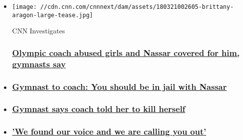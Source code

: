 \begin{itemize}
\item
  \href{https://www.cnn.com/interactive/2018/03/investigates/john-geddert-abuse/}{}

  \texttt{[image: //cdn.cnn.com/cnnnext/dam/assets/180321002605-brittany-aragon-large-tease.jpg]}

  CNN Investigates

  \hypertarget{olympic-coach-abused-girls-and-nassar-covered-for-him-gymnasts-say}{%
  \subsubsection{\texorpdfstring{\href{https://www.cnn.com/interactive/2018/03/investigates/john-geddert-abuse/}{Olympic
  coach abused girls and Nassar covered for him, gymnasts
  say}}{Olympic coach abused girls and Nassar covered for him, gymnasts say}}\label{olympic-coach-abused-girls-and-nassar-covered-for-him-gymnasts-say}}
\item
  \hypertarget{gymnast-to-coach-you-should-be-in-jail-with-nassar}{%
  \subsubsection{\texorpdfstring{\href{/videos/us/2018/03/23/former-gymnasts-call-out-coach-orig-tc.cnn}{Gymnast
  to coach: You should be in jail with
  Nassar}}{Gymnast to coach: You should be in jail with Nassar}}\label{gymnast-to-coach-you-should-be-in-jail-with-nassar}}
\item
  \hypertarget{gymnast-says-coach-told-her-to-kill-herself}{%
  \subsubsection{\texorpdfstring{\href{/videos/us/2018/03/23/makayla-thrush-orig-tc.cnn}{Gymnast
  says coach told her to kill
  herself}}{Gymnast says coach told her to kill herself}}\label{gymnast-says-coach-told-her-to-kill-herself}}
\item
  \hypertarget{we-found-our-voice-and-we-are-calling-you-out}{%
  \subsubsection{\texorpdfstring{\href{/videos/us/2018/03/23/izzy-hutchins-orig-tc.cnn}{'We
  found our voice and we are calling you
  out'}}{'We found our voice and we are calling you out'}}\label{we-found-our-voice-and-we-are-calling-you-out}}
\end{itemize}


